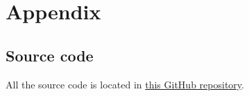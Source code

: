 \documentclass[../main.tex]{subfiles}
\begin{document}
\section{Appendix}
\subsection{Source code}
All the source code is located in \href{https://github.com/kmaasrud/cnn-fys-stk4155}{this GitHub repository}.
\end{document}
